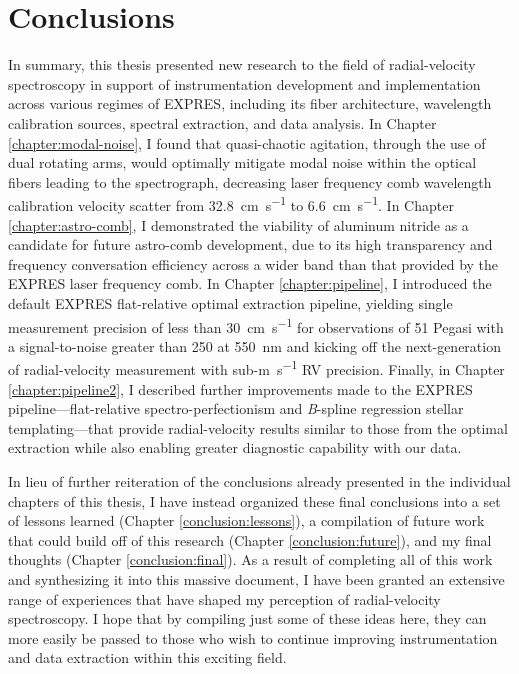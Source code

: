 \chapter{Conclusions}\label{chapter:conclusion}

In summary, this thesis presented new research to the field of radial-velocity spectroscopy in support of instrumentation development and implementation across various regimes of EXPRES, including its fiber architecture, wavelength calibration sources, spectral extraction, and data analysis. In Chapter \ref{chapter:modal-noise}, I found that quasi-chaotic agitation, through the use of dual rotating arms, would optimally mitigate modal noise within the optical fibers leading to the spectrograph, decreasing laser frequency comb wavelength calibration velocity scatter from 32.8~\si{\centi\meter\per\second} to 6.6~\si{\centi\meter\per\second}. In Chapter \ref{chapter:astro-comb}, I demonstrated the viability of aluminum nitride as a candidate for future astro-comb development, due to its high transparency and frequency conversation efficiency across a wider band than that provided by the EXPRES laser frequency comb. In Chapter \ref{chapter:pipeline}, I introduced the default EXPRES flat-relative optimal extraction pipeline, yielding single measurement precision of less than 30~\si{\centi\meter\per\second} for observations of 51 Pegasi with a signal-to-noise greater than 250 at 550~\si{\nano\meter} and kicking off the next-generation of radial-velocity measurement with sub-\si{\meter\per\second} RV precision. Finally, in Chapter \ref{chapter:pipeline2}, I described further improvements made to the EXPRES pipeline---flat-relative spectro-perfectionism and \textit{B}-spline regression stellar templating---that provide radial-velocity results similar to those from the optimal extraction while also enabling greater diagnostic capability with our data.

In lieu of further reiteration of the conclusions already presented in the individual chapters of this thesis, I have instead organized these final conclusions into a set of lessons learned (Chapter \ref{conclusion:lessons}), a compilation of future work that could build off of this research (Chapter \ref{conclusion:future}), and my final thoughts (Chapter \ref{conclusion:final}). As a result of completing all of this work and synthesizing it into this massive document, I have been granted an extensive range of experiences that have shaped my perception of radial-velocity spectroscopy. I hope that by compiling just some of these ideas here, they can more easily be passed to those who wish to continue improving instrumentation and data extraction within this exciting field.

